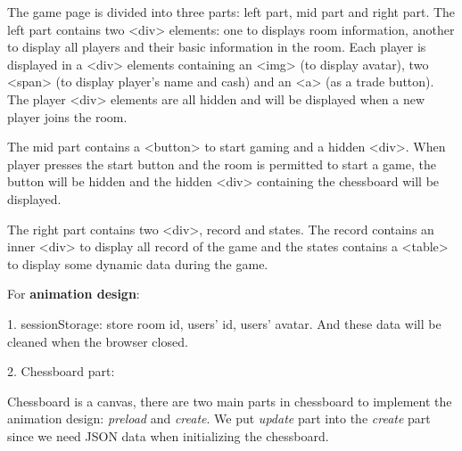 \documentclass[a4paper,11pt]{article}
\begin{document}
The game page is divided into three parts: left part, mid part and right part. The left part contains two \textless div\textgreater\; elements: one to displays room information, another to display all players and their basic information in the room. Each player is displayed in a \textless div\textgreater\; elements containing an \textless img\textgreater\; (to display avatar), two \textless span\textgreater\; (to display player's name and cash) and an \textless a\textgreater\; (as a trade button). The player \textless div\textgreater\; elements are all hidden and will be displayed when a new player joins the room. 

The mid part contains a \textless button\textgreater\; to start gaming and a hidden \textless div\textgreater\;. When player presses the start button and the room is permitted to start a game, the button will be hidden and the hidden \textless div\textgreater\; containing the chessboard will be displayed. 

The right part contains two \textless div\textgreater\;, record and states. The record contains an inner \textless div\textgreater\; to display all record of the game and the states contains a \textless table\textgreater\; to display some dynamic data during the game.


For \textbf{animation design}:

1.	 sessionStorage: store room id, users' id, users' avatar. And these data will be cleaned when the browser closed.

2.	Chessboard part:

	Chessboard is a canvas, there are two main parts in chessboard to implement the animation design: \emph{preload} and \emph{create}. We put \emph{update} part into the \emph{create} part since we need JSON data when initializing the chessboard.
	
\end{document}
